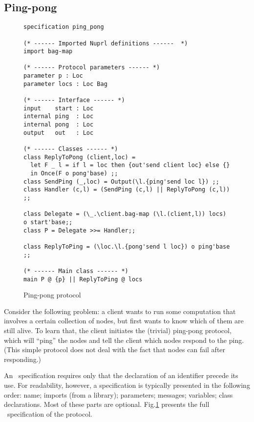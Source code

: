 \documentclass[final]{article}
\begin{document}


\subsection{Ping-pong}
\label{sec:ping-pong}


\begin{figure}[!t]
  \begin{lstlisting}[basicstyle=\small]
specification ping_pong

(* ------ Imported Nuprl definitions ------  *)
import bag-map

(* ------ Protocol parameters ------ *)
parameter p : Loc
parameter locs : Loc Bag

(* ------ Interface ------ *)
input    start : Loc
internal ping  : Loc
internal pong  : Loc
output   out   : Loc

(* ------ Classes ------ *)
class ReplyToPong (client,loc) =
  let F _ l = if l = loc then {out'send client loc} else {}
  in Once(F o pong'base) ;;
class SendPing (_,loc) = Output(\l.{ping'send loc l}) ;;
class Handler (c,l) = (SendPing (c,l) || ReplyToPong (c,l)) ;;

class Delegate = (\_.\client.bag-map (\l.(client,l)) locs) o start'base;;
class P = Delegate >>= Handler;;

class ReplyToPing = (\loc.\l.{pong'send l loc}) o ping'base ;;

(* ------ Main class ------ *)
main P @ {p} || ReplyToPing @ locs
  \end{lstlisting}
  \caption{Ping-pong protocol}
  \label{fig:ping-pong}
\end{figure}

Consider the following problem: a client wants to run some computation
that involves a certain collection of nodes, but first wants to know
which of them are still alive.
%
To learn that, the client initiates the (trivial) ping-pong protocol,
which will ``ping'' the nodes and tell the client which nodes respond
to the ping.  (This simple protocol does not deal with the fact that
nodes can fail after responding.)

An \eml\ specification requires only that the declaration of an
identifier precede its use.  For readability, however, a specification
is typically presented in the following order: name; imports (from a
library); parameters; messages; variables; class declarations.  Most
of these parts are optional.  Fig.\ref{fig:ping-pong} presents the
full \eml\ specification of the protocol.
\end{document}

